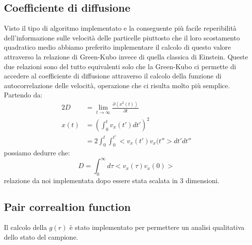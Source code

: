 \documentclass[a4paper,11pt]{article}
\begin{document}
		\subsection{Coefficiente di diffusione} %
		\label{sub:coefficiente_di_diffusione}
			Visto il tipo di algoritmo implementato e la conseguente più facile 
			reperibilità dell'informazione sulle velocità delle particelle 
			piuttosto che il loro scostamento quadratico medio abbiamo preferito
			implementare il calcolo di questo valore attraverso la relazione di 
			Green-Kubo invece di quella classica di Einstein. Queste due relazioni
			sono del tutto equivalenti solo che la Green-Kubo ci permette di 
			accedere al coefficiente di diffusione attraverso il calcolo della 
			funzione di autocorrelazione delle velocità, operazione che ci risulta 
			molto più semplice.\\
			Partendo da:
			\begin{align*}
				2 D & = \lim_{t\rightarrow \infty} \frac{\partial\left < x^2(t)\right>}{\partial t}\\
				x(t) &= \left(\int_{0}^{t} v_x(t')dt'\right)^2 \\
				&= 2 \int_{0}^{t} \int_{0}^{t'} <v_x(t')v_x(t''>dt'dt''
			\end{align*}
			possiamo dedurre che:
			\begin{equation}
				D = \int_{0}^{\infty} d\tau <v_x(\tau)v_x(0)>
			\end{equation}
			relazione da noi implementata dopo essere stata scalata in 3 dimensioni.
		\subsection*{Pair correaltion function} %
		\label{sub:pair_correaltion_function}
			Il calcolo della $g(r)$ è stato implementato per permettere un analisi
			qualitativa dello stato del campione.
\end{document}
